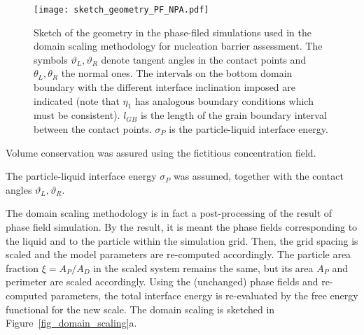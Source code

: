 \begin{figure}
	\centering
%		
%		
%		
	\texttt{[image: sketch\_geometry\_PF\_NPA.pdf]}
	\caption{Sketch of the geometry in the phase-filed simulations used in the domain scaling methodology for nucleation barrier assessment. The symbols $\vartheta_L,\vartheta_R$ denote tangent angles in the contact points and $\theta_L,\theta_R$ the normal ones. The intervals on the bottom domain boundary with the different interface inclination imposed are indicated (note that $\eta_1$ has analogous boundary conditions which must be consistent). $l_{GB}$ is the length of the grain boundary interval between the contact points. $\sigma_P$ is the particle-liquid interface energy.}
	\label{fig_sketch_domain_scaling_PF}
\end{figure}

Volume conservation was assured using the fictitious concentration field. 

The particle-liquid interface energy $\sigma_P$ was assumed, together with the contact angles $\vartheta_L, \vartheta_R$. 

The domain scaling methodology is in fact a post-processing of the result of phase field simulation. By the result, it is meant the phase fields corresponding to the liquid and to the particle within the simulation grid. Then, the grid spacing is scaled and the model parameters are re-computed accordingly. The particle area fraction $\xi=A_P/A_D$ in the scaled system remains the same, but its area $A_P$ and perimeter are scaled accordingly. Using the (unchanged) phase fields and re-computed parameters, the total interface energy is re-evaluated by the free energy functional for the new scale. The domain scaling is sketched in Figure~\ref{fig_domain_scaling}a. 

